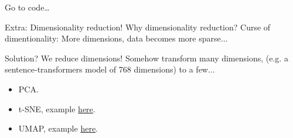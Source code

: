 \documentclass{beamer}
\begin{document}
\begin{frame}
    Go to code\dots
\end{frame}

\begin{frame}{Extra: Dimensionality reduction!}
    Why dimensionality reduction? Curse of dimentionality: More dimensions, data becomes more sparse...

    \vspace{0.5cm}

    Solution? We reduce dimensions! Somehow transform many dimensions, (e.g. a sentence-transformers model of 768 dimensions) to a few...

    \vspace{0.5cm}
    \begin{itemize}
        \item PCA.
        \item t-SNE, example \href{https://distill.pub/2016/misread-tsne/}{here}.
        \item UMAP, example \href{https://pair-code.github.io/understanding-umap/}{here}.
    \end{itemize}
\end{frame}
\end{document}
